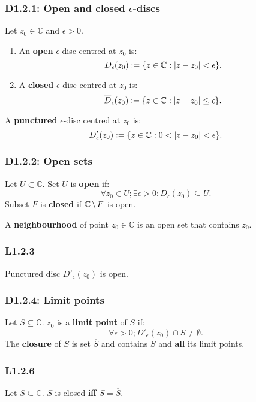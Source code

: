 \documentclass{article}
\newcommand{\deq}{\vcentcolon=}
\begin{document}
\begin{multicols*}{3}
\newcolumn

\subsubsection*{D1.2.1: Open and closed $\epsilon$-discs}
Let $z_0\in\mathbb{C}$ and $\epsilon>0$.
\begin{enumerate}
    \item An \textbf{open} $\epsilon$-disc
    centred at $z_0$ is:
    $$D_{\epsilon}(z_0)
    \deq\{z\in\mathbb{C}:|z-z_0|<\epsilon\}.$$

    \item A \textbf{closed} $\epsilon$-disc
    centred at $z_0$ is:
    $$\overline{D}_{\epsilon}(z_0)
    \deq\{z\in\mathbb{C}:|z-z_0|\leq\epsilon\}.$$
\end{enumerate}
A \textbf{punctured} $\epsilon$-disc centred at $z_0$ is:
$$D'_{\epsilon}(z_0)\deq\{z\in\mathbb{C}:0<|z-z_0|<\epsilon\}.$$

\subsubsection*{D1.2.2: Open sets}
Let $U\subset\mathbb{C}$. Set $U$ is \textbf{open} if:
$$\forall z_0\in U;\exists\epsilon>0:D_{\epsilon}(z_0)\subseteq U.$$
Subset $F$ is \textbf{closed} if
$\mathbb{C}\hspace{0.02in}\backslash\hspace{0.02in} F$ is open.

A \textbf{neighbourhood} of point $z_0\in\mathbb{C}$
is an open set that contains $z_0$.

\subsubsection*{L1.2.3}
Punctured disc $D'_{\epsilon}(z_0)$ is open.

\subsubsection*{D1.2.4: Limit points}
Let $S\subseteq\mathbb{C}$. $z_0$ is a \textbf{limit point} of $S$ if:
$$\forall\epsilon>0; D'_{\epsilon}(z_0)\cap S\neq\emptyset.$$
The \textbf{closure} of $S$ is set $\overline{S}$ and contains $S$
and \textbf{all} its limit points.

\subsubsection*{L1.2.6}
Let $S\subseteq\mathbb{C}$.
$S$ is closed \textbf{if{}f} $S=\overline{S}$.


\end{multicols*}
\end{document}
